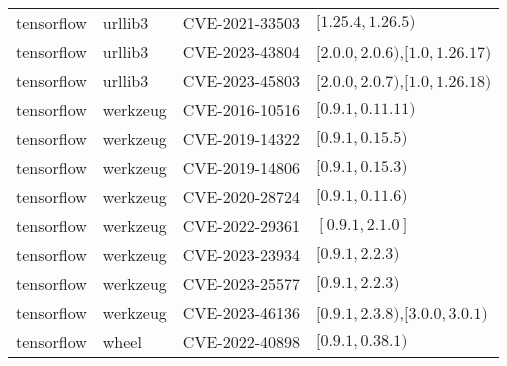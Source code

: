 \begin{tabular}{llll}
tensorflow & urllib3 & CVE-2021-33503 & $[1.25.4,1.26.5)$ \\
tensorflow & urllib3 & CVE-2023-43804 & $[2.0.0,2.0.6)$,$[1.0,1.26.17)$ \\
tensorflow & urllib3 & CVE-2023-45803 & $[2.0.0,2.0.7)$,$[1.0,1.26.18)$ \\
tensorflow & werkzeug & CVE-2016-10516 & $[0.9.1,0.11.11)$ \\
tensorflow & werkzeug & CVE-2019-14322 & $[0.9.1,0.15.5)$ \\
tensorflow & werkzeug & CVE-2019-14806 & $[0.9.1,0.15.3)$ \\
tensorflow & werkzeug & CVE-2020-28724 & $[0.9.1,0.11.6)$ \\
tensorflow & werkzeug & CVE-2022-29361 & $[0.9.1,2.1.0]$ \\
tensorflow & werkzeug & CVE-2023-23934 & $[0.9.1,2.2.3)$ \\
tensorflow & werkzeug & CVE-2023-25577 & $[0.9.1,2.2.3)$ \\
tensorflow & werkzeug & CVE-2023-46136 & $[0.9.1,2.3.8)$,$[3.0.0,3.0.1)$ \\
tensorflow & wheel & CVE-2022-40898 & $[0.9.1,0.38.1)$ \\
\bottomrule
\end{tabular}
